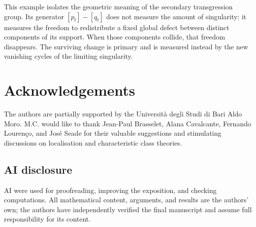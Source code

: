 \documentclass[10pt,a4paper,dvipsnames,x11names]{amsart}
\numberwithin{equation}{section}
\theoremstyle{plain}
\theoremstyle{definition}
\theoremstyle{remark}
\begin{document}
This example isolates the geometric meaning of the secondary transgression group.  Its generator $[p_t]-[q_t]$ does not measure the amount of singularity: it measures the freedom to redistribute a fixed global defect between distinct components of its support.  When those components collide, that freedom disappears.  The surviving change is primary and is measured instead by the new vanishing cycles of the limiting singularity.


\section*{Acknowledgements}

The authors are partially supported by the Università degli Studi di Bari Aldo Moro. M.C. would like to thank Jean-Paul Brasselet, Alana Cavalcante, Fernando Lourenço, and José Seade for their valuable suggestions and stimulating discussions on localisation and characteristic class theories.

 
\subsection*{AI disclosure}
AI were used for proofreading, improving the exposition, and checking computations. All mathematical content, arguments, and results are the authors' own; the authors have independently verified the final manuscript and assume full responsibility for its content.
 


 
\end{document}
